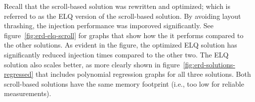 \documentclass[a4paper,11pt]{kth-mag}
\begin{document}
        Recall that the scroll-based solution was rewritten and optimized; which is referred to as the \gls{ELQ} version of the scroll-based solution.
        By avoiding layout thrashing, the injection performance was imporoved significantly.
        See figure~\ref{fig:erd-elq-scroll} for graphs that show how the it performs compared to the other solutions.
        As evident in the figure, the optimized \gls{ELQ} solution has significantly reduced injection times compared to the other two.
        The \gls{ELQ} solution also scales better, as more clearly shown in figure~\ref{fig:erd-solutions-regressed} that includes polynomial regression graphs for all three solutions.
        Both scroll-based solutions have the same memory footprint (i.e., too low for reliable measurements).
        \begin{figure}[h!]
          \tiny
          \begin{center}
            \begin{minipage}[t]{.5\textwidth}
              \vspace{0pt}
              \centering
            \end{minipage}%
            \begin{minipage}[t]{.5\textwidth}
              \vspace{0pt}
              \centering
              \begin{tikzpicture}

\end{tikzpicture}
\end{minipage}
\end{center}
\end{figure}
\end{document}
